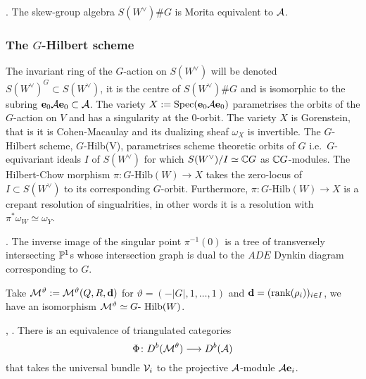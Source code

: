 \documentclass{amsart}
\theoremstyle{definition}
\begin{document}
\begin{theorem}\cite{MR2593679}.
The skew-group algebra $S(W^\vee) \# G$ is Morita equivalent to $\mathcal{A}$.
\end{theorem}

\subsubsection{The $G$-Hilbert scheme}

The invariant ring of the $G$-action on $S(W^\vee)$ will be denoted $S(W^\vee)^G \subset S(W^\vee)$, it is the centre of $S(W^\vee) \# G$ and is isomorphic to the subring $\mathbf{e}_0 \mathcal{A} \mathbf{e}_0 \subset \mathcal{A}$.
The variety $X:= \operatorname{Spec}(\mathbf{e}_0 \mathcal{A} \mathbf{e}_0)$ parametrises the orbits of the $G$-action on $V$ and has a singularity at the $0$-orbit.
The variety $X$ is Gorenstein, that is it is Cohen-Macaulay and its dualizing sheaf $\omega_X$ is invertible.
The $G$-Hilbert scheme, $G$-Hilb(V), parametrises scheme theoretic orbits of $G$ i.e.\ $G$-equivariant ideals $I$ of $S(W^\vee)$ for which $S(W^\vee)/I \simeq \mathbb{C} G$ as $\mathbb{C} G$-modules.
The Hilbert-Chow morphism $\pi \colon G\text{-Hilb}(W) \rightarrow X$ takes the zero-locus of $I \subset S(W^\vee)$ to its corresponding $G$-orbit.
Furthermore, $\pi \colon G\text{-Hilb}(W) \rightarrow X$ is a crepant resolution of singualrities, in other words it is a resolution with $\pi^*\omega_W \simeq \omega_Y$.

\begin{theorem}\cite{MR604577}.
The inverse image of the singular point $\pi^{-1}(0)$ is a tree of transversely intersecting $\mathbb{P}^1$s whose intersection graph is dual to the $ADE$ Dynkin diagram corresponding to $G$.
\end{theorem}

Take $\mathcal{M}^\vartheta:=\mathcal{M}^\vartheta(Q,R,\mathbf{d})$ for $\vartheta = (-|G|,1, \ldots, 1)$ and $\mathbf{d}=(\text{rank}(\rho_i))_{i \in I}$, we have an isomorphism $\mathcal{M}^\vartheta \simeq G\text{- Hilb}(W)$.

\begin{theorem}\cite{MR740077}, \cite{MR1752785}.
There is an equivalence of triangulated categories $$\Phi \colon D^b(\mathcal{M}^\theta) \longrightarrow D^b(\mathcal{A})$$ that takes the universal bundle $\mathcal{V}_i$ to the projective $\mathcal{A}$-module $\mathcal{A}\mathbf{e}_i$.
\end{theorem}
\end{document}
